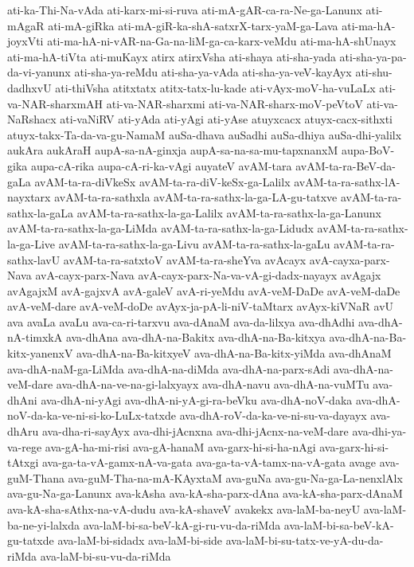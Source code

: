 {ati-ka-Thi-Na-vAda
ati-karx-mi-si-ruva
ati-mA-gAR-ca-ra-Ne-ga-Lanunx
ati-mAgaR
ati-mA-giRka
ati-mA-giR-ka-shA-satxrX-tarx-yaM-ga-Lava
ati-ma-hA-joyxVti
ati-ma-hA-ni-vAR-na-Ga-na-liM-ga-ca-karx-veMdu
ati-ma-hA-shUnayx
ati-ma-hA-tiVta
ati-muKayx
atirx
atirxVsha
ati-shaya
ati-sha-yada
ati-sha-ya-pa-da-vi-yanunx
ati-sha-ya-reMdu
ati-sha-ya-vAda
ati-sha-ya-veV-kayAyx
ati-shu-dadhxvU
ati-thiVsha
atitxtatx
atitx-tatx-lu-kade
ati-vAyx-moV-ha-vuLaLx
ati-va-NAR-sharxmAH
ati-va-NAR-sharxmi
ati-va-NAR-sharx-moV-peVtoV
ati-va-NaRshacx
ati-vaNiRV
ati-yAda
ati-yAgi
ati-yAse
atuyxcacx
atuyx-cacx-sithxti
atuyx-takx-Ta-da-va-gu-NamaM
auSa-dhava
auSadhi
auSa-dhiya
auSa-dhi-yalilx
aukAra
aukAraH
aupA-sa-nA-ginxja
aupA-sa-na-sa-mu-tapxnanxM
aupa-BoV-gika
aupa-cA-rika
aupa-cA-ri-ka-vAgi
auyateV
avAM-tara
avAM-ta-ra-BeV-da-gaLa
avAM-ta-ra-diVkeSx
avAM-ta-ra-diV-keSx-ga-Lalilx
avAM-ta-ra-sathx-lA-nayxtarx
avAM-ta-ra-sathxla
avAM-ta-ra-sathx-la-ga-LA-gu-tatxve
avAM-ta-ra-sathx-la-gaLa
avAM-ta-ra-sathx-la-ga-Lalilx
avAM-ta-ra-sathx-la-ga-Lanunx
avAM-ta-ra-sathx-la-ga-LiMda
avAM-ta-ra-sathx-la-ga-Lidudx
avAM-ta-ra-sathx-la-ga-Live
avAM-ta-ra-sathx-la-ga-Livu
avAM-ta-ra-sathx-la-gaLu
avAM-ta-ra-sathx-lavU
avAM-ta-ra-satxtoV
avAM-ta-ra-sheYva
avAcayx
avA-cayxa-parx-Nava
avA-cayx-parx-Nava
avA-cayx-parx-Na-va-vA-gi-dadx-nayayx
avAgajx
avAgajxM
avA-gajxvA
avA-galeV
avA-ri-yeMdu
avA-veM-DaDe
avA-veM-daDe
avA-veM-dare
avA-veM-doDe
avAyx-ja-pA-li-niV-taMtarx
avAyx-kiVNaR
avU
ava
avaLa
avaLu
ava-ca-ri-tarxvu
ava-dAnaM
ava-da-lilxya
ava-dhAdhi
ava-dhA-nA-timxkA
ava-dhAna
ava-dhA-na-Bakitx
ava-dhA-na-Ba-kitxya
ava-dhA-na-Ba-kitx-yanenxV
ava-dhA-na-Ba-kitxyeV
ava-dhA-na-Ba-kitx-yiMda
ava-dhAnaM
ava-dhA-naM-ga-LiMda
ava-dhA-na-diMda
ava-dhA-na-parx-sAdi
ava-dhA-na-veM-dare
ava-dhA-na-ve-na-gi-lalxyayx
ava-dhA-navu
ava-dhA-na-vuMTu
ava-dhAni
ava-dhA-ni-yAgi
ava-dhA-ni-yA-gi-ra-beVku
ava-dhA-noV-daka
ava-dhA-noV-da-ka-ve-ni-si-ko-LuLx-tatxde
ava-dhA-roV-da-ka-ve-ni-su-va-dayayx
ava-dhAru
ava-dha-ri-sayAyx
ava-dhi-jAcnxna
ava-dhi-jAcnx-na-veM-dare
ava-dhi-ya-va-rege
ava-gA-ha-mi-risi
ava-gA-hanaM
ava-garx-hi-si-ha-nAgi
ava-garx-hi-si-tAtxgi
ava-ga-ta-vA-gamx-nA-va-gata
ava-ga-ta-vA-tamx-na-vA-gata
avage
ava-guM-Thana
ava-guM-Tha-na-mA-KAyxtaM
ava-guNa
ava-gu-Na-ga-La-nenxlAlx
ava-gu-Na-ga-Lanunx
ava-kAsha
ava-kA-sha-parx-dAna
ava-kA-sha-parx-dAnaM
ava-kA-sha-sAthx-na-vA-dudu
ava-kA-shaveV
avakekx
ava-laM-ba-neyU
ava-laM-ba-ne-yi-lalxda
ava-laM-bi-sa-beV-kA-gi-ru-vu-da-riMda
ava-laM-bi-sa-beV-kA-gu-tatxde
ava-laM-bi-sidadx
ava-laM-bi-side
ava-laM-bi-su-tatx-ve-yA-du-da-riMda
ava-laM-bi-su-vu-da-riMda
}
